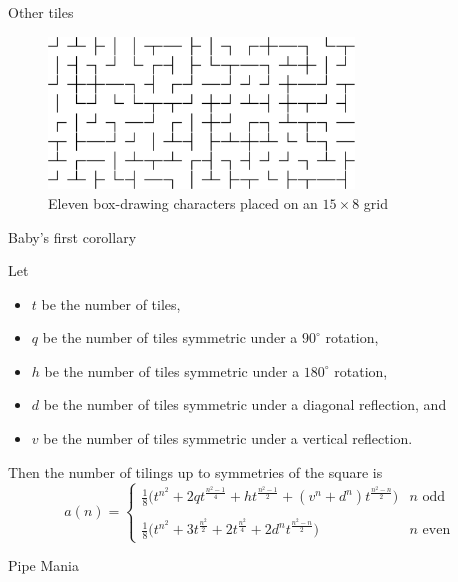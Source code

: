 \documentclass{beamer}%
\newcommand\paren[1]{\biggl(#1\biggr)}
\begin{document}
\begin{frame}{Other tiles} %
    \begin{figure}
      
      \includegraphics[width=230pt]{pseudomaze2.png}
      \caption{Eleven box-drawing characters placed on an $15 \times 8$ grid}
    \end{figure}
\end{frame}

\begin{frame}{Baby's first corollary}
  \begin{corollary}
    Let \begin{itemize}
      \item $t$ be the number of tiles,
      \item $q$ be the number of tiles symmetric under a $90^\circ$ rotation,
      \item $h$ be the number of tiles symmetric under a $180^\circ$ rotation,
      \item $d$ be the number of tiles symmetric under a diagonal reflection, and
      \item $v$ be the number of tiles symmetric under a vertical reflection.
    \end{itemize}
    Then the number of tilings up to symmetries of the square is
  \[
    a(n) = \begin{cases}
      \frac 18 \paren{
        t^{n^2} + 2qt^{\frac{n^2-1}{4}} + ht^{\frac{n^2-1}{2}} + (v^n + d^n)t^{\frac{n^2-n}{2}}
      } & n \text{ odd} \\
      \\
      \frac 18 \paren{
        t^{n^2} + 3t^{\frac{n^2}{2}} + 2t^{\frac{n^2}{4}} + 2d^n t^{\frac{n^2-n}{2}}
      } & n \text{ even}
    \end{cases}
  \]
  \end{corollary}
\end{frame}

\begin{frame}{Pipe Mania}
\end{frame}
\end{document}
